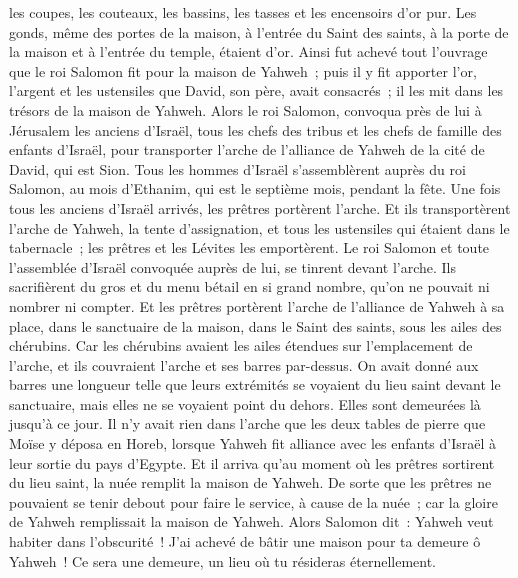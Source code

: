 \begin{multicols}{2}
les coupes, les couteaux, les bassins, les tasses et les encensoirs d'or pur. Les gonds, même des portes de la maison, à l'entrée du Saint des saints, à la porte de la maison et à l'entrée du temple, étaient d'or.
Ainsi fut achevé tout l'ouvrage que le roi Salomon fit pour la maison de Yahweh~; puis il y fit apporter l'or, l'argent et les ustensiles que David, son père, avait consacrés~; il les mit dans les trésors de la maison de Yahweh.
\VerseOne{}Alors le roi Salomon, convoqua près de lui à Jérusalem les anciens d'Israël, tous les chefs des tribus et les chefs de famille des enfants d'Israël, pour transporter l'arche de l'alliance de Yahweh de la cité de David, qui est Sion.
Tous les hommes d'Israël s'assemblèrent auprès du roi Salomon, au mois d'Ethanim, qui est le septième mois, pendant la fête.
Une fois tous les anciens d'Israël arrivés, les prêtres portèrent l'arche.
Et ils transportèrent l'arche de Yahweh, la tente d'assignation, et tous les ustensiles qui étaient dans le tabernacle~; les prêtres et les Lévites les emportèrent.
Le roi Salomon et toute l'assemblée d'Israël convoquée auprès de lui, se tinrent devant l'arche. Ils sacrifièrent du gros et du menu bétail en si grand nombre, qu'on ne pouvait ni nombrer ni compter.
Et les prêtres portèrent l'arche de l'alliance de Yahweh à sa place, dans le sanctuaire de la maison, dans le Saint des saints, sous les ailes des chérubins.
Car les chérubins avaient les ailes étendues sur l'emplacement de l'arche, et ils couvraient l'arche et ses barres par-dessus.
On avait donné aux barres une longueur telle que leurs extrémités se voyaient du lieu saint devant le sanctuaire, mais elles ne se voyaient point du dehors. Elles sont demeurées là jusqu'à ce jour.
Il n'y avait rien dans l'arche que les deux tables de pierre que Moïse y déposa en Horeb, lorsque Yahweh fit alliance avec les enfants d'Israël à leur sortie du pays d'Egypte.
Et il arriva qu'au moment où les prêtres sortirent du lieu saint, la nuée remplit la maison de Yahweh.
De sorte que les prêtres ne pouvaient se tenir debout pour faire le service, à cause de la nuée~; car la gloire de Yahweh remplissait la maison de Yahweh.
Alors Salomon dit~: Yahweh veut habiter dans l'obscurité~!
J'ai achevé de bâtir une maison pour ta demeure ô Yahweh~! Ce sera une demeure, un lieu où tu résideras éternellement.

\end{multicols}
